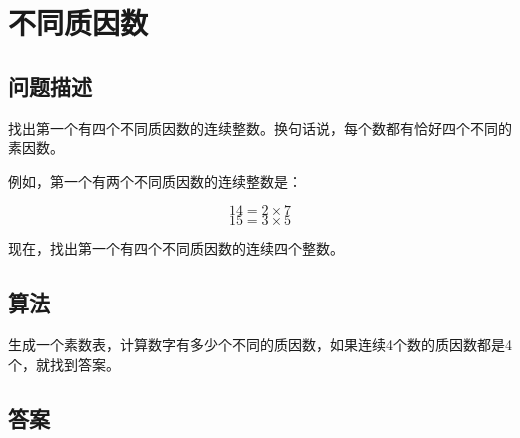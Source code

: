 \section{不同质因数}
\subsection{问题描述}
\begin{tcolorbox}
找出第一个有四个不同质因数的连续整数。换句话说，每个数都有恰好四个不同的素因数。 

例如，第一个有两个不同质因数的连续整数是：

\[
14 = 2 \times 7
\]
\[
15 = 3 \times 5
\]

现在，找出第一个有四个不同质因数的连续四个整数。

\end{tcolorbox}

\subsection{算法}
生成一个素数表，计算数字有多少个不同的质因数，如果连续4个数的质因数都是4个，就找到答案。


\subsection{答案}
